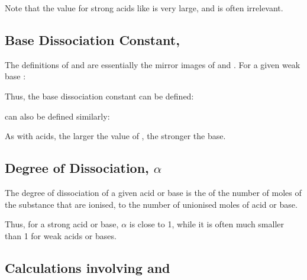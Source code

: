 			Note that the \Ka{} value for strong acids like  is very large, and is often irrelevant.





		\pagebreak
		\subsection{Base Dissociation Constant, \texorpdfstring{\Kb{}}{Kb}}

			The definitions of \Kb{} and \pKb{} are essentially the mirror images of \Ka{} and \pKa{}. For a given weak base :


			Thus, the base dissociation constant \Kb{} can be defined:

			\mathdiagram{
				\[ \MKa = \frac{[\ch{BH+}][\ch{OH-}]}{[\ch{B}]} \]
			}

			\pKb{} can also be defined similarly:

			\mathdiagram{
				\[ \MpKb = -\lg{\MKb} \]
			}

			As with acids, the larger the value of \Kb{}, the stronger the base.



		\subsection{Degree of Dissociation, \texorpdfstring{$\alpha$}{a}}

			The degree of dissociation of a given acid or base is the  of the number of moles of the substance that are ionised, to
			the number of unionised moles of acid or base.

			\mathdiagram{
				\[ \alpha = \cfrac{[\mathrm{acid}]_{dissoc}}{[\mathrm{acid}]_{initial}} \]
			}

			Thus, for a strong acid or base, $\alpha$ is close to 1, while it is often much smaller than 1 for weak acids or bases.



		\subsection{Calculations involving \texorpdfstring{\Ka{}}{Ka} and \texorpdfstring{\Kb{}}{Kb}}

